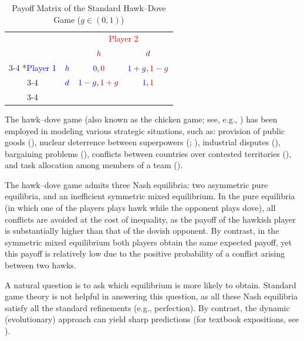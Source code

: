 \documentclass[12pt]{article}
\numberwithin{equation}{section}
\numberwithin{figure}{section}
\theoremstyle{definition}
\theoremstyle{plain}
\theoremstyle{plain}
\theoremstyle{plain}
\theoremstyle{remark}
\theoremstyle{plain}
\theoremstyle{plain}
\begin{document}
\begin{table}
\begin{centering}
\caption{Payoff Matrix of the Standard Hawk--Dove Game ($g\in\left(0,1\right)$) \label{tab:canonical-Hawk--dove-Games-1}}
\par\end{centering}
\smallskip{}
\centering
    \setlength{\extrarowheight}{2pt}
    \begin{tabular}{cc|c|c|}
      & \multicolumn{1}{c}{} & \multicolumn{2}{c}{\textcolor{red}{Player 2}}\\
      & \multicolumn{1}{c}{} & \multicolumn{1}{c}{$\textcolor{red}{h}$}  & \multicolumn{1}{c}{$\textcolor{red}{d}$} \\\cline{3-4}
      \multirow{2}*{\textcolor{blue}{Player 1}}  & $\textcolor{blue}{h}$ & $\textcolor{blue}{0},\textcolor{red}{0}$ & $\textcolor{blue}{1+g},\textcolor{red}{1-g}$ \\\cline{3-4}
      & $\textcolor{blue}{d}$ & $\textcolor{blue}{1-g},\textcolor{red}{1+g}$ & $\textcolor{blue}{1},\textcolor{red}{1}$ \\\cline{3-4}
    \end{tabular}
  \end{table}


The hawk--dove game 
(also known as the chicken game; see, e.g., \citealp{rapoport1966game,aumann1987correlated}) has been employed in modeling various strategic situations, such as: provision of public goods (\citealp{lipnowski1983voluntary}), nuclear deterrence between superpowers (\citealp{brams1987threat};  \citealp{dixit2019we}), industrial disputes (\citealp{bornstein1997cooperation}), bargaining problems (\citealp{brams2001fallback}), conflicts between countries over contested territories (\citealp{baliga2012strategy,baliga2020strategy}), and task allocation among members of a team (\citealp{herold2020evolution}). 

The hawk–dove game admits three Nash equilibria: two asymmetric pure equilibria, and 
an inefficient symmetric mixed equilibrium. In the pure equilibria (in which one of the players plays hawk while the opponent plays dove), all conflicts are avoided at the cost of inequality, as the payoff of the hawkish player is substantially higher than that of the dovish opponent. By contrast, in the symmetric mixed equilibrium 
both players obtain the same expected payoff,
yet this payoff is relatively low due to the positive probability of a conflict arising between two hawks. 

A natural question is to ask which equilibrium is more likely to obtain. Standard game theory is not helpful in answering this question, as all these Nash equilibria satisfy all the standard refinements (e.g., perfection). By contrast, the dynamic (evolutionary) approach can yield sharp predictions (for textbook expositions, see \citealp{weibull1997evolutionary,sandholm2010population}).
\end{document}
